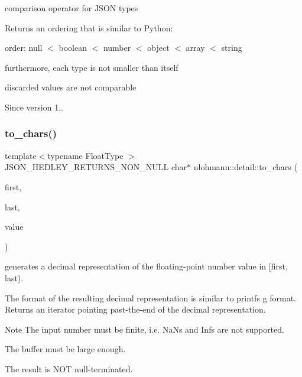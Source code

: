 comparison operator for J\+S\+ON types 

Returns an ordering that is similar to Python\+:
\begin{DoxyItemize}
\item order\+: null $<$ boolean $<$ number $<$ object $<$ array $<$ string
\item furthermore, each type is not smaller than itself
\item discarded values are not comparable
\end{DoxyItemize}

\begin{DoxySince}{Since}
version 1.. 
\end{DoxySince}
\mbox{\label{namespacenlohmann_1_1detail_a6cca370ac6c99294dbe4fe24716a57dd}} 
\subsubsection{\texorpdfstring{to\+\_\+chars()}{to\_chars()}}
{\footnotesize\ttfamily template$<$typename Float\+Type $>$ \\
J\+S\+O\+N\+\_\+\+H\+E\+D\+L\+E\+Y\+\_\+\+R\+E\+T\+U\+R\+N\+S\+\_\+\+N\+O\+N\+\_\+\+N\+U\+LL char$\ast$ nlohmann\+::detail\+::to\+\_\+chars (\begin{DoxyParamCaption}\item[{char $\ast$}]{first,  }\item[{const char $\ast$}]{last,  }\item[{Float\+Type}]{value }\end{DoxyParamCaption})}



generates a decimal representation of the floating-\/point number value in \mbox{[}first, last). 

The format of the resulting decimal representation is similar to printf\textquotesingle{}s g format. Returns an iterator pointing past-\/the-\/end of the decimal representation.

\begin{DoxyNote}{Note}
The input number must be finite, i.\+e. NaN\textquotesingle{}s and Inf\textquotesingle{}s are not supported. 

The buffer must be large enough. 

The result is N\+OT null-\/terminated. 
\end{DoxyNote}
